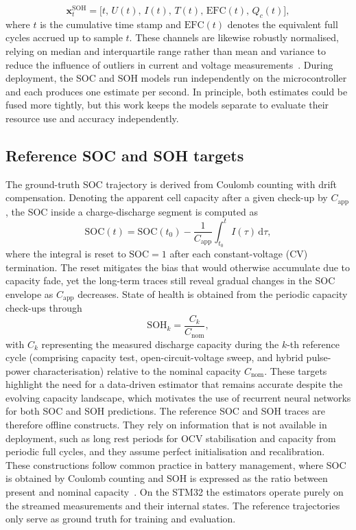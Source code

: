 \documentclass[final,3p,times]{elsarticle}
\begin{document}
\begin{equation}
    \mathbf{x}^{\mathrm{SOH}}_t = \bigl[ t,\, U(t),\, I(t),\, T(t),\, \mathrm{EFC}(t),\, Q_c(t) \bigr],
\end{equation}
where $t$ is the cumulative time stamp and $\mathrm{EFC}(t)$ denotes the equivalent full cycles accrued up to sample $t$. These channels are likewise robustly normalised, relying on median and interquartile range rather than mean and variance to reduce the influence of outliers in current and voltage measurements~\cite{huberRobustStatistics2009,pedregosaScikitlearnMachineLearning2012}. During deployment, the SOC and SOH models run independently on the microcontroller and each produces one estimate per second. In principle, both estimates could be fused more tightly, but this work keeps the models separate to evaluate their resource use and accuracy independently.
\subsection{Reference SOC and SOH targets}
The ground-truth SOC trajectory is derived from Coulomb counting with drift compensation. Denoting the apparent cell capacity after a given check-up by $C_{\mathrm{app}}$, the SOC inside a charge-discharge segment is computed as
\begin{equation}
    \mathrm{SOC}(t) = \mathrm{SOC}(t_0) - \frac{1}{C_{\mathrm{app}}}\int_{t_0}^{t} I(\tau)\,\mathrm{d}\tau,
\end{equation}
where the integral is reset to $\mathrm{SOC}=1$ after each constant-voltage (CV) termination. The reset mitigates the bias that would otherwise accumulate due to capacity fade, yet the long-term traces still reveal gradual changes in the SOC envelope as $C_{\mathrm{app}}$ decreases.
State of health is obtained from the periodic capacity check-ups through
\begin{equation}
    \mathrm{SOH}_k = \frac{C_k}{C_{\mathrm{nom}}},
\end{equation}
with $C_k$ representing the measured discharge capacity during the $k$-th reference cycle (comprising capacity test, open-circuit-voltage sweep, and hybrid pulse-power characterisation) relative to the nominal capacity $C_{\mathrm{nom}}$. These targets highlight the need for a data-driven estimator that remains accurate despite the evolving capacity landscape, which motivates the use of recurrent neural networks for both SOC and SOH predictions.
The reference SOC and SOH traces are therefore offline constructs. They rely on information that is not available in deployment, such as long rest periods for OCV stabilisation and capacity from periodic full cycles, and they assume perfect initialisation and recalibration. These constructions follow common practice in battery management, where SOC is obtained by Coulomb counting and SOH is expressed as the ratio between present and nominal capacity~\cite{plettBatteryManagementSystems2015,a.m.s.m.h.s.attanayakaEstimationStateCharge2019,berecibarCriticalReviewState2016}. On the STM32 the estimators operate purely on the streamed measurements and their internal states. The reference trajectories only serve as ground truth for training and evaluation.
\end{document}

